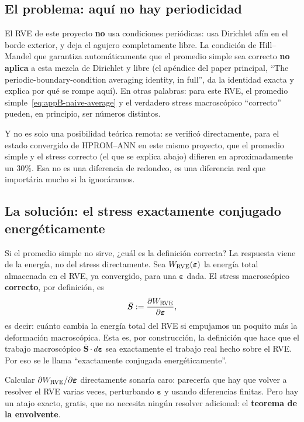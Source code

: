 \documentclass[11pt,a4paper]{article}
\begin{document}
\subsection{El problema: aqu\'i no hay periodicidad}

El RVE de este proyecto \textbf{no} usa condiciones peri\'odicas: usa
Dirichlet afín en el borde exterior, y deja el agujero completamente
libre. La condici\'on de Hill--Mandel que garantiza autom\'aticamente
que el promedio simple sea correcto \textbf{no aplica} a esta mezcla de
Dirichlet y libre (el ap\'endice del paper principal, ``The
periodic-boundary-condition averaging identity, in full'', da la
identidad exacta y explica por qu\'e se rompe aqu\'i). En otras
palabras: para este RVE, el promedio simple~\eqref{eq:appB-naive-average}
y el verdadero stress macrosc\'opico ``correcto'' pueden, en principio,
ser n\'umeros distintos.

Y no es solo una posibilidad te\'orica remota: se verific\'o
directamente, para el estado convergido de HPROM--ANN en este mismo
proyecto, que el promedio simple y el stress correcto (el que se
explica abajo) difieren en aproximadamente un $30\%$. Esa no es una
diferencia de redondeo, es una diferencia real que import\'aria mucho
si la ignor\'aramos.

\subsection{La soluci\'on: el stress exactamente conjugado
energ\'eticamente}

Si el promedio simple no sirve, ¿cu\'al es la definici\'on correcta?
La respuesta viene de la energ\'ia, no del stress directamente. Sea
$W_{\rm RVE}(\bm\varepsilon)$ la energ\'ia total almacenada en el RVE,
ya convergido, para una $\bm\varepsilon$ dada. El stress macrosc\'opico
\textbf{correcto}, por definici\'on, es
\begin{equation}
 \bar{\bm S} := \frac{\partial W_{\rm RVE}}{\partial\bm\varepsilon},
 \label{eq:appB-conjugate-stress}
\end{equation}
es decir: cu\'anto cambia la energ\'ia total del RVE si empujamos un
poquito m\'as la deformaci\'on macrosc\'opica. Esta es, por
construcci\'on, la definici\'on que hace que el trabajo macrosc\'opico
$\bar{\bm S}\cdot d\bm\varepsilon$ sea exactamente el trabajo real hecho
sobre el RVE. Por eso se le llama ``exactamente conjugada
energ\'eticamente''.

Calcular $\partial W_{\rm RVE}/\partial\bm\varepsilon$ directamente
sonar\'ia caro: parecer\'ia que hay que volver a resolver el RVE varias
veces, perturbando $\bm\varepsilon$ y usando diferencias finitas. Pero
hay un atajo exacto, gratis, que no necesita ning\'un resolver
adicional: el \textbf{teorema de la envolvente}.
\end{document}
